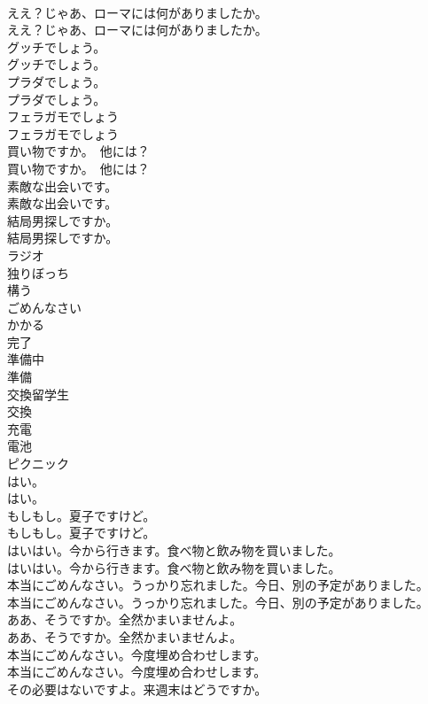 \documentclass[8pt]{extreport}
\begin{document}
\begin{CJK}{UTF8}{min}
\\	ええ？じゃあ、ローマには何がありましたか。	
\\	ええ？じゃあ、ローマには何がありましたか。 
\\	グッチでしょう。	
\\	グッチでしょう。 
\\	プラダでしょう。	
\\	プラダでしょう。 
\\	フェラガモでしょう	
\\	フェラガモでしょう 
\\	買い物ですか。　他には？	
\\	買い物ですか。　他には？ 
\\	素敵な出会いです。	
\\	素敵な出会いです。 
\\	結局男探しですか。	
\\	結局男探しですか。 
\\	ラジオ
\\	独りぼっち
\\	構う
\\	ごめんなさい
\\	かかる
\\	完了
\\	準備中
\\	準備
\\	交換留学生
\\	交換
\\	充電
\\	電池
\\	ピクニック
\\	はい。	
\\	はい。 
\\	もしもし。夏子ですけど。	
\\	もしもし。夏子ですけど。 
\\	はいはい。今から行きます。食べ物と飲み物を買いました。	
\\	はいはい。今から行きます。食べ物と飲み物を買いました。 
\\	本当にごめんなさい。うっかり忘れました。今日、別の予定がありました。	
\\	本当にごめんなさい。うっかり忘れました。今日、別の予定がありました。 
\\	ああ、そうですか。全然かまいませんよ。	
\\	ああ、そうですか。全然かまいませんよ。 
\\	本当にごめんなさい。今度埋め合わせします。	
\\	本当にごめんなさい。今度埋め合わせします。 
\\	その必要はないですよ。来週末はどうですか。	

\end{CJK}
\end{document}
